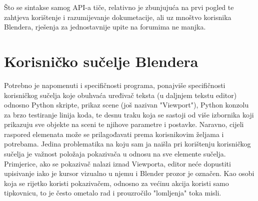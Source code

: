 Što se sintakse samog API-a tiče, relativno je zbunjujuća na prvi pogled te zahtjeva korištenje i razumijevanje dokumetacije, ali uz mnoštvo korisnika Blendera, rješenja za jednostavnije upite na forumima ne manjka.

\section{Korisničko sučelje Blendera}

Potrebno je napomenuti i specifičnosti programa, ponajviše specifičnosti korisničkog sučelja koje obuhvaća uređivač teksta (u daljnjem tekstu editor) odnosno Python skripte, prikaz scene (još nazivan "Viewport"), Python konzolu za brzo testiranje linija koda, te desnu traku koja se sastoji od više izbornika koji prikazuju sve objekte na sceni te njihove parametre i postavke. Naravno, cijeli raspored elemenata može se prilagođavati prema korisnikovim željama i potrebama. 
Jedina problematika na koju sam ja naišla pri korištenju korisničkog sučelja je važnost položaja pokazivača u odnosu na sve elemente sučelja. Primjerice, ako se pokazivač nalazi iznad Viewporta, editor neće dopustiti upisivanje iako je kursor vizualno u njemu i Blender prozor je označen. Kao osobi koja se rijetko koristi pokazivačem, odnosno za većinu akcija koristi samo tipkovnicu, to je često ometalo rad i prouzročilo "lomljenja" toka misli.

